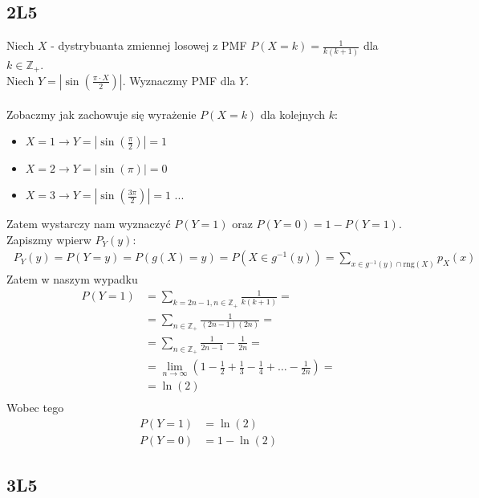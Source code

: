 \documentclass{article}
\begin{document}
\subsection{2L5}

Niech $X$ - dystrybuanta zmiennej losowej z PMF $P(X=k)=\frac{1}{k(k+1)}$ dla $k\in\mathbb{Z_{+}}$.\\ Niech $Y=\left|\sin\left(\frac{\pi\cdot X}{2}\right)\right|$. Wyznaczmy PMF dla $Y$.\\\\
\noindent
Zobaczmy jak zachowuje się wyrażenie $P(X=k)$ dla kolejnych $k$:
\begin{itemize}
    \item $X=1 \rightarrow Y=|\sin(\frac{\pi}{2})| = 1$
    \item $X=2 \rightarrow Y=|\sin(\pi)| = 0$
    \item $X=3 \rightarrow Y=|\sin(\frac{3\pi}{2})| = 1$ ...
\end{itemize}
Zatem wystarczy nam wyznaczyć $P(Y=1)$ oraz $P(Y=0) = 1 - P(Y=1)$. Zapiszmy wpierw $P_Y(y)$:
\setcounter{equation}{0}
\begin{align}~
   P_Y(y)=P(Y=y)=P(g(X)=y)=P(X\in g^{-1}(y)) = \sum_{x\in g^{-1}(y)\cap\text{rng}(X)} p_X(x)
\end{align}
Zatem w naszym wypadku
\begin{align}
    P(Y=1) &= \sum_{k=2n-1, n\in\mathbb{Z_{+}}} \frac{1}{k(k+1)} =\\
    &=\sum_{n\in\mathbb{Z_{+}}}\frac{1}{(2n-1)(2n)} =\\
    &=\sum_{n\in\mathbb{Z_{+}}}\frac{1}{2n-1} - \frac{1}{2n} =\\
    &=\lim_{n\rightarrow\infty}\left(1 - \frac{1}{2} + \frac{1}{3} - \frac{1}{4} + \dots- \frac{1}{2n}\right) =\\
    &=\ln(2)\\
\end{align}
Wobec tego
\begin{align}
    P(Y=1) &= \ln(2)\\
    P(Y=0) &= 1-\ln(2)
\end{align}

\subsection{3L5}
\end{document}
